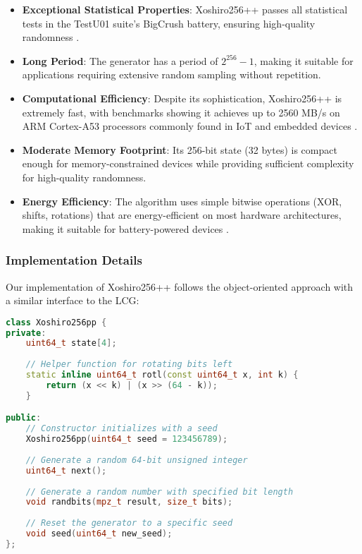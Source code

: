 \begin{itemize}
    \item \textbf{Exceptional Statistical Properties}: Xoshiro256++ passes all statistical tests in the TestU01 suite's BigCrush battery, ensuring high-quality randomness \cite{blackman2019, xoshiro_website}.
    
    \item \textbf{Long Period}: The generator has a period of $2^{256} - 1$, making it suitable for applications requiring extensive random sampling without repetition.
    
    \item \textbf{Computational Efficiency}: Despite its sophistication, Xoshiro256++ is extremely fast, with benchmarks showing it achieves up to 2560 MB/s on ARM Cortex-A53 processors commonly found in IoT and embedded devices \cite{xoshiro_website}.
    
    \item \textbf{Moderate Memory Footprint}: Its 256-bit state (32 bytes) is compact enough for memory-constrained devices while providing sufficient complexity for high-quality randomness.
    
    \item \textbf{Energy Efficiency}: The algorithm uses simple bitwise operations (XOR, shifts, rotations) that are energy-efficient on most hardware architectures, making it suitable for battery-powered devices \cite{prng_iot}.
\end{itemize}

\subsubsection{Implementation Details}

Our implementation of Xoshiro256++ follows the object-oriented approach with a similar interface to the LCG:

\begin{lstlisting}[language=C++, caption=Xoshiro256++ Implementation (Header)]
class Xoshiro256pp {
private:
    uint64_t state[4];
    
    // Helper function for rotating bits left
    static inline uint64_t rotl(const uint64_t x, int k) {
        return (x << k) | (x >> (64 - k));
    }

public:
    // Constructor initializes with a seed
    Xoshiro256pp(uint64_t seed = 123456789);
    
    // Generate a random 64-bit unsigned integer
    uint64_t next();
    
    // Generate a random number with specified bit length
    void randbits(mpz_t result, size_t bits);
    
    // Reset the generator to a specific seed
    void seed(uint64_t new_seed);
};
\end{lstlisting}

